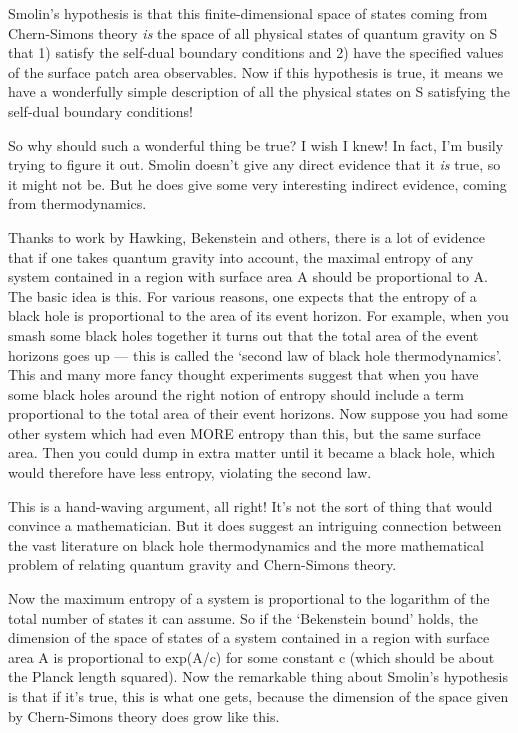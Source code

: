 Smolin's hypothesis is that this finite-dimensional space of states coming
from Chern-Simons theory \emph{is} the space of all physical states of quantum 
gravity on S that 1) satisfy the self-dual boundary conditions and 2) have 
the specified values of the surface patch area observables.  Now if this
hypothesis is true, it means we have a wonderfully simple description of
all the physical states on S satisfying the self-dual boundary conditions!

So why should such a wonderful thing be true?  I wish I knew!  In fact,
I'm busily trying to figure it out.  Smolin doesn't give any direct evidence
that it \emph{is} true, so it might not be.  But he does give some very interesting
indirect evidence, coming from thermodynamics.  

Thanks to work by Hawking, Bekenstein and others, there is a lot of evidence
that if one takes quantum gravity into account, the maximal entropy of any 
system contained in a region with surface area A should be proportional to A.
The basic idea is this.  For various reasons, one expects that the entropy 
of a black hole is proportional to the area of its event horizon.  For example, 
when you smash some black holes together it turns out that the total area 
of the event horizons goes up --- this is called the `second law of black 
hole thermodynamics'.  This and many more fancy thought experiments 
suggest that when you have some black holes around the right notion of 
entropy should include a term proportional to the total area of their 
event horizons.  Now suppose you had some other system which 
had even MORE entropy than this, but the same surface area.  Then you could 
dump in extra matter until it became a black hole, which would therefore have 
less entropy, violating the second law.  

This is a hand-waving argument, all right!  It's not the sort of thing
that would convince a mathematician.  But it does suggest an intriguing
connection between the vast literature on black hole thermodynamics and
the more mathematical problem of relating quantum gravity and Chern-Simons
theory.  

Now the maximum entropy of a system is proportional to the logarithm 
of the total number of states it can assume.  So if the `Bekenstein bound'
holds, the dimension of the space of states of a system contained in 
a region with surface area A is proportional to exp(A/c) for some constant
c (which should be about the Planck length squared).   Now the remarkable
thing about Smolin's hypothesis is that if it's true, this is what one
gets, because the dimension of the space given by Chern-Simons theory
does grow like this.  

